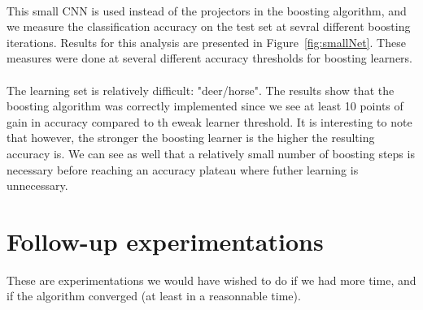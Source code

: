 \documentclass[11 pt]{article}
\begin{document}
\paragraph{} This small CNN is used instead of the projectors in the boosting algorithm, and we measure the classification accuracy on the test set at sevral different boosting iterations. Results for this analysis are presented in Figure~\ref{fig:smallNet}. These measures were done at several different accuracy thresholds for boosting learners.  

\paragraph{}The learning set is relatively difficult: "deer/horse". The results show that the boosting algorithm was correctly implemented since we see at least 10 points of gain in accuracy compared to th eweak learner threshold. It is interesting to note that however, the stronger the boosting learner is the higher the resulting accuracy is. We can see as well that a relatively small number of boosting steps is necessary before reaching an accuracy plateau where futher learning is unnecessary. 

\section{Follow-up experimentations}

These are experimentations we would have wished to do if we had more time, and if the algorithm converged (at least in a reasonnable time).

\end{document}
